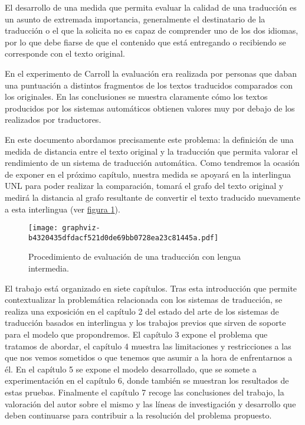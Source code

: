 \documentclass[a4paper,12pt,spanish]{book}
\begin{document}
El desarrollo de una medida que permita evaluar la calidad de una traducción es
un asunto de extremada importancia, generalmente el destinatario de la traducción o
el que la solicita no es capaz de comprender uno de los dos idiomas, por lo que
debe fiarse de que el contenido que está entregando o recibiendo se corresponde con
el texto original.

En el experimento de Carroll la evaluación era realizada por personas que daban una
puntuación a distintos fragmentos de los textos traducidos comparados con los
originales. En las conclusiones se muestra claramente cómo los textos producidos por
los sistemas automáticos obtienen valores muy por debajo de los realizados por
traductores.

En este documento abordamos precisamente este problema: la definición de una medida
de distancia entre el texto original y la traducción que permita valorar el
rendimiento de un sistema de traducción automática. Como tendremos la ocasión de
exponer en el próximo capítulo, nuestra medida se apoyará en la interlingua UNL para
poder realizar la comparación, tomará el grafo del texto original y medirá la
distancia al grafo resultante de convertir el texto traducido nuevamente a esta
interlingua (ver \hyperref[0.intro:fig-problema-interlingua]{figura  \ref*{0.intro:fig-problema-interlingua}}).
\begin{figure}[htbp]
\centering
\capstart

\texttt{[image: graphviz-b4320435dfdacf521d0de69bb0728ea23c81445a.pdf]}
\caption{Procedimiento de evaluación de una traducción con lengua intermedia.}\label{0.intro:fig-problema-interlingua}\end{figure}

El trabajo está organizado en siete capítulos. Tras esta introducción que permite
contextualizar la problemática relacionada con los sistemas de traducción, se realiza
una exposición en el capítulo 2 del estado del arte de los sistemas de traducción
basados en interlingua y los trabajos previos que sirven de soporte para el modelo
que propondremos. El capítulo 3 expone el problema que tratamos de abordar, el
capítulo 4 muestra las limitaciones y restricciones a las que nos vemos sometidos o
que tenemos que asumir a la hora de enfrentarnos a él. En el capítulo 5 se expone
el modelo desarrollado, que se somete a experimentación en el capítulo 6, donde también
se muestran los resultados de estas pruebas. Finalmente el capítulo 7 recoge las
conclusiones del trabajo, la valoración del autor sobre el mismo y las líneas
de investigación y desarrollo que deben continuarse para contribuir a la
resolución del problema propuesto.
\newpage
\end{document}
